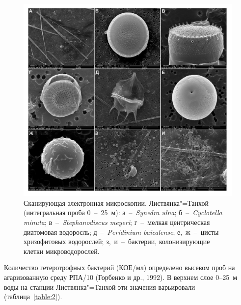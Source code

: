 \documentclass[a4paper,12pt,openany,final]{extreport}
\def\oldcaption{} \let\oldcaption=\caption
\def\caption{\stepcounter{captionsnum}\oldcaption}
\begin{document}
\begin{figure}\centering
\includegraphics[width=\linewidth]{media/image3.jpeg}

\caption{Сканирующая электронная микроскопии, Листвянка"=Танхой (интегральная проба 0~--~25~м): а~--~\textit{Synedra ulna}; б~--~\textit{Cyclotella minuta}; в~--~\textit{Stephanodiscus meyeri}; г~--~мелкая центрическая диатомовая водоросль; д~--~\textit{Peridinium baicalense}; е,~ж~--~цисты хризофитовых водорослей; з,~и~--~бактерии, колонизирующие клетки микроводорослей.}\label{fig:micro}
\end{figure}

Количество гетеротрофных бактерий (КОЕ/мл) определено высевом проб на агаризованную среду РПА/10 (Горбенко и др., 1992). В верхнем слое 0--25~м воды на станции Листвянка"=Танхой эти значения варьировали (таблица~\ref{table:2}).
\end{document}
